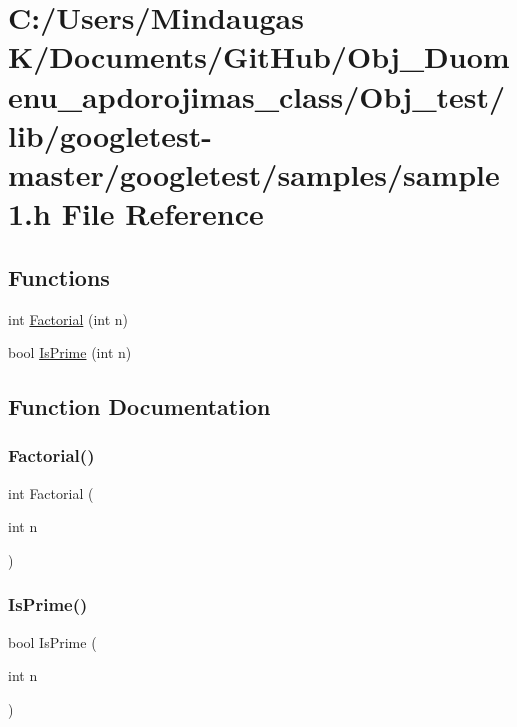 \hypertarget{_obj__test_2lib_2googletest-master_2googletest_2samples_2sample1_8h}{}\section{C\+:/\+Users/\+Mindaugas K/\+Documents/\+Git\+Hub/\+Obj\+\_\+\+Duomenu\+\_\+apdorojimas\+\_\+class/\+Obj\+\_\+test/lib/googletest-\/master/googletest/samples/sample1.h File Reference}
\label{_obj__test_2lib_2googletest-master_2googletest_2samples_2sample1_8h}
\subsection*{Functions}
\begin{DoxyCompactItemize}
\item 
int \mbox{\hyperlink{_obj__test_2lib_2googletest-master_2googletest_2samples_2sample1_8h_a0e7da4d7a69c5b5afb707807aa177017}{Factorial}} (int n)
\item 
bool \mbox{\hyperlink{_obj__test_2lib_2googletest-master_2googletest_2samples_2sample1_8h_a7093217f5edc11fe277d03bd064e5f11}{Is\+Prime}} (int n)
\end{DoxyCompactItemize}


\subsection{Function Documentation}
\mbox{\label{_obj__test_2lib_2googletest-master_2googletest_2samples_2sample1_8h_a0e7da4d7a69c5b5afb707807aa177017}} 
\subsubsection{\texorpdfstring{Factorial()}{Factorial()}}
{\footnotesize\ttfamily int Factorial (\begin{DoxyParamCaption}\item[{int}]{n }\end{DoxyParamCaption})}

\mbox{\label{_obj__test_2lib_2googletest-master_2googletest_2samples_2sample1_8h_a7093217f5edc11fe277d03bd064e5f11}} 
\subsubsection{\texorpdfstring{IsPrime()}{IsPrime()}}
{\footnotesize\ttfamily bool Is\+Prime (\begin{DoxyParamCaption}\item[{int}]{n }\end{DoxyParamCaption})}

